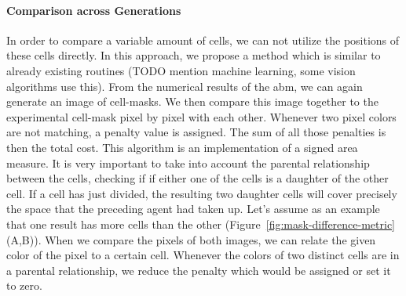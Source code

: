 \documentclass{article}
\begin{document}
\paragraph{Comparison across Generations}
\label{paragraph:comparison-across-generations}

In order to compare a variable amount of cells, we can not utilize the positions of these cells
directly.
In this approach, we propose a method which is similar to already existing routines (TODO mention
machine learning, some vision algorithms use this).
From the numerical results of the \ac{abm}, we can again generate an image of cell-masks.
We then compare this image together to the experimental cell-mask pixel by pixel with each other.
Whenever two pixel colors are not matching, a penalty value is assigned.
The sum of all those penalties is then the total cost.
This algorithm is an implementation of a signed area measure.
It is very important to take into account the parental relationship between the cells, checking if
if either one of the cells is a daughter of the other cell.
If a cell has just divided, the resulting two daughter cells will cover precisely the space that the
preceding agent had taken up.
Let's assume as an example that one result has more cells than the other
(Figure~\ref{fig:mask-difference-metric} (A,B)).
When we compare the pixels of both images, we can relate the given color of the pixel to a certain
cell.
Whenever the colors of two distinct cells are in a parental relationship, we reduce the penalty
which would be assigned or set it to zero.
\end{document}
